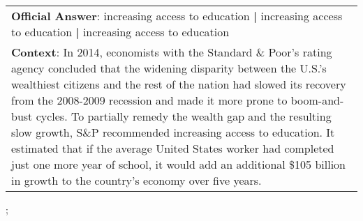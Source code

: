 \begin{figure*}[ht]
{\begin{tabular}{p{}}
            \textbf{Official Answer}: increasing access to education \textbf{|} increasing access to education \textbf{|} increasing access to education                                                                                                                                                                                                                                                                                                                                                                                                                                                                   \\
            \textbf{Context}: In 2014, economists with the Standard \& Poor's rating agency concluded that the widening disparity between the U.S.'s wealthiest citizens and the rest of the nation had slowed its recovery from the 2008-2009 recession and made it more prone to boom-and-bust cycles. To partially remedy the wealth gap and the resulting slow growth, S\&P recommended increasing access to education. It estimated that if the average United States worker had completed just one more year of school, it would add an additional \$105 billion in growth to the country's economy over five years. \\
        \end{tabular}
    };
    \label{fig:ex-5727f16c3acd2414000df05b}
\end{figure*}

